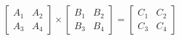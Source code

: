 \documentclass[preview]{standalone}
\begin{document}
\begin{align*}
\begin{bmatrix} A_1 & A_2 \\ A_3 & A_4 \end{bmatrix} \times \begin{bmatrix} B_1 & B_2 \\ B_3 & B_4 \end{bmatrix} = \begin{bmatrix} C_1 & C_2 \\ C_3 & C_4 \end{bmatrix}
\end{align*}
\end{document}
